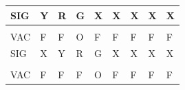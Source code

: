\documentclass[a4paper,12pt]{article}
\begin{document}
\begin{table}[htp]
\begin{tabular}{lllllllll}
\multicolumn{1}{|l|}{SIG}   & \multicolumn{1}{l|}{\cellcolor[HTML]{F8FF00}Y} & \multicolumn{1}{l|}{\cellcolor[HTML]{FE0000}R} & \multicolumn{1}{l|}{\cellcolor[HTML]{009901}G} & \multicolumn{1}{l|}{X}                         & \multicolumn{1}{l|}{X}                         & \multicolumn{1}{l|}{X}                         & \multicolumn{1}{l|}{X}                                                & \multicolumn{1}{l|}{X}                                                \\ \hline
                            &                                                &                                                &                                                &                                                &                                                &                                                &                                                                       &                                                                       \\ \hline
\multicolumn{1}{|l|}{VAC}   & \multicolumn{1}{l|}{\cellcolor[HTML]{32CB00}F} & \multicolumn{1}{l|}{\cellcolor[HTML]{32CB00}F} & \multicolumn{1}{l|}{\cellcolor[HTML]{FD6864}O} & \multicolumn{1}{l|}{\cellcolor[HTML]{32CB00}F} & \multicolumn{1}{l|}{\cellcolor[HTML]{32CB00}F} & \multicolumn{1}{l|}{\cellcolor[HTML]{32CB00}F} & \multicolumn{1}{l|}{\cellcolor[HTML]{32CB00}F}                        & \multicolumn{1}{l|}{\cellcolor[HTML]{32CB00}F}                        \\ \hline
\multicolumn{1}{|l|}{SIG}   & \multicolumn{1}{l|}{X}                         & \multicolumn{1}{l|}{\cellcolor[HTML]{F8FF00}Y} & \multicolumn{1}{l|}{\cellcolor[HTML]{FE0000}R} & \multicolumn{1}{l|}{\cellcolor[HTML]{009901}G} & \multicolumn{1}{l|}{X}                         & \multicolumn{1}{l|}{X}                         & \multicolumn{1}{l|}{X}                                                & \multicolumn{1}{l|}{X}                                                \\ \hline
                            &                                                &                                                &                                                &                                                &                                                &                                                &                                                                       &                                                                       \\ \hline
\multicolumn{1}{|l|}{VAC}   & \multicolumn{1}{l|}{\cellcolor[HTML]{32CB00}F} & \multicolumn{1}{l|}{\cellcolor[HTML]{32CB00}F} & \multicolumn{1}{l|}{\cellcolor[HTML]{32CB00}F} & \multicolumn{1}{l|}{\cellcolor[HTML]{FD6864}O} & \multicolumn{1}{l|}{\cellcolor[HTML]{32CB00}F} & \multicolumn{1}{l|}{\cellcolor[HTML]{32CB00}F} & \multicolumn{1}{l|}{\cellcolor[HTML]{32CB00}F}                        & \multicolumn{1}{l|}{\cellcolor[HTML]{32CB00}F}                        \\ \hline

\end{tabular}
\end{table}
\end{document}
